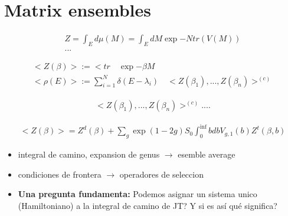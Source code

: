 \documentclass{article}
\newcommand{\caja}[2]{%
  \begin{tcolorbox}[colback=blue!5!white,colframe=blue!25!black,title=#1]
    #2
  \end{tcolorbox}%
}
\begin{document}
\section{Matrix ensembles } %
\label{sec:Matrix ensembles }
\caja{Definicion (Promedio sobre matrices)}{
  \begin{gather}
    Z = \int_{E }^{}d\mu (M) =\int_{E }^{}dM \exp{-N tr(V(M))}\\
    ...
    \label{eq:avovermatrix}
  \end{gather}
}
\caja{ejemplo de observables}{
  \begin{gather}
    <Z(\beta)> := <tr\quad \exp{-\beta M }\\
    <\rho (E)>:= \sum_{i=1 }^{N }\delta(E-\lambda_i ) \quad <Z(\beta_1), ..., Z(\beta_n )>^{(c)}
    \label{eq:observablesex}
  \end{gather}
}
\caja{Expansion perturbativa }{
  \begin{gather}
    <Z(\beta_1),..., Z(\beta_n)>^{(c)} ....
    \label{eq:eq1}
  \end{gather}
}
\caja{funcion de 1 punto }{
  \begin{gather}
    <Z(\beta)> = Z ^ {d }(\beta) + \sum_{g }^{}\exp{(1-2g)S_0 }\int_{0 }^{\inf }bdb V _{g,1 } (b) Z^t(\beta,b) 
    \label{eq:1pointfunction }
  \end{gather}
  \begin{itemize}
    \item integral de camino, expansion de genus $\rightarrow $ esemble average
    \item condiciones de frontera $\rightarrow$ operadores de seleccion
  \end{itemize}
}
\begin{itemize}
  \item \textbf{ Una pregunta fundamenta: } Podemos asignar un sistema unico (Hamiltoniano) a la integral de camino de JT? Y si es así qué significa?
\end{itemize}
\end{document}
